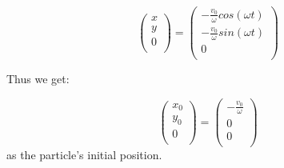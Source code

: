\documentclass[a4paper,12pt,twoside]{article}
\begin{document}
\begin{equation*}
	\begin{pmatrix} x\\ y\\ 0\\ \end{pmatrix} = \begin{pmatrix} -\frac{v_0}{\omega} cos(\omega t)\\ -\frac{v_0}{\omega} sin(\omega t)\\ 0\\ \end{pmatrix}
\end{equation*}

	Thus we get:

\begin{equation*}
	\begin{pmatrix} x_0\\ y_0\\ 0\\ \end{pmatrix} = \begin{pmatrix} -\frac{v_0}{\omega}\\ 0\\ 0\\ \end{pmatrix}
\end{equation*}
as the particle's initial position.
\end{document}
